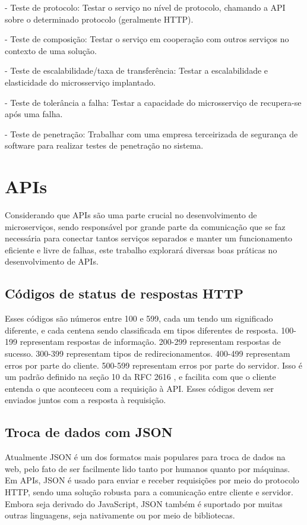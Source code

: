 - Teste de protocolo: Testar o serviço no nível de protocolo, chamando a API sobre o determinado protocolo (geralmente HTTP).

- Teste de composição: Testar o serviço em cooperação com outros serviços no contexto de uma solução.

- Teste de escalabilidade/taxa de transferência: Testar a escalabilidade e elasticidade do microsserviço implantado.

- Teste de tolerância a falha: Testar a capacidade do microsserviço de recupera-se após uma falha.

- Teste de penetração: Trabalhar com uma empresa terceirizada de segurança de software para realizar testes de penetração no sistema. \cite{Familiar2015}

\section{APIs}\label{boas-praticas-apis}

Considerando que APIs são uma parte crucial no desenvolvimento de microserviços, sendo responsável por grande parte da comunicação que se faz necessária para conectar tantos serviços separados e manter um funcionamento eficiente e livre de falhas, este trabalho explorará diversas boas práticas no desenvolvimento de APIs.

\subsection{Códigos de status de respostas HTTP}
Esses códigos são números entre 100 e 599, cada um tendo um significado diferente, e cada centena sendo classificada em tipos diferentes de resposta. 100-199 representam respostas de informação. 200-299 representam respostas de sucesso. 300-399 representam tipos de redirecionamentos. 400-499 representam erros por parte do cliente. 500-599 representam erros por parte do servidor. Isso é um padrão definido na seção 10 da RFC 2616 \cite{rfc_http_nielsen_1999}, e facilita com que o cliente entenda o que aconteceu com a requisição à API. Esses códigos devem ser enviados juntos com a resposta à requisição.

\subsection{Troca de dados com JSON}
Atualmente JSON é um dos formatos mais populares para troca de dados na web, pelo fato de ser facilmente lido tanto por humanos quanto por máquinas. Em APIs, JSON é usado para enviar e receber requisições por meio do protocolo HTTP, sendo uma solução robusta para a comunicação entre cliente e servidor. Embora seja derivado do JavaScript, JSON também é suportado por muitas outras linguagens, seja nativamente ou por meio de bibliotecas.  \cite{json_bourhis_2020}


